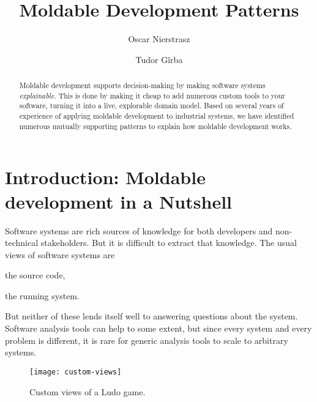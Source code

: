 \documentclass[sigconf]{acmart}
\begin{document}
\title{Moldable Development Patterns}

\author{Oscar Nierstrasz}

\author{Tudor G\^irba}

\renewcommand{\shortauthors}{G\^irba et al.}

\begin{abstract}
Moldable development supports decision-making by making software systems \emph{explainable}.
This is done by making it cheap to add numerous custom tools to your software, turning it into a live, explorable domain model.
Based on several years of experience of applying moldable development to industrial systems, we have identified numerous mutually supporting patterns to explain how moldable development works.
\end{abstract}


\maketitle

\section{Introduction: Moldable development in a Nutshell}

Software systems are rich sources of knowledge for both developers and non-technical stakeholders.
But it is difficult to extract that knowledge.
The usual views of software systems are
\begin{inparaenum}[(i)]
\item the source code,
\item the running system.
\end{inparaenum}
But neither of these lends itself well to answering questions about the system.
Software analysis tools can help to some extent, but since every system and every problem is different, it is rare for generic analysis tools to scale to arbitrary systems.

\begin{figure}[h]
  \texttt{[image: custom-views]}
  \caption{Custom views of a Ludo game.}
  \label{fig:ludo-views}
\end{figure}
\end{document}
